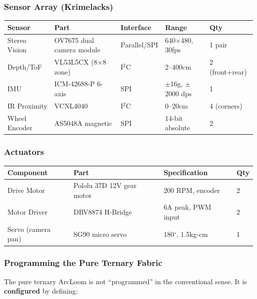 \documentclass[11pt, a4paper]{article}
\begin{document}
\subsubsection{Sensor Array (Krimelacks)}

\begin{center}
\begin{tabular}{@{}lllll@{}}
\toprule
\textbf{Sensor} & \textbf{Part} & \textbf{Interface} & \textbf{Range} & \textbf{Qty} \\
\midrule
Stereo Vision & OV7675 dual camera module & Parallel/SPI & 640$\times$480, 30fps & 1 pair \\
Depth/ToF & VL53L5CX (8$\times$8 zone) & I$^2$C & 2--400cm & 2 (front+rear) \\
IMU & ICM-42688-P 6-axis & SPI & $\pm$16g, $\pm$2000 dps & 1 \\
IR Proximity & VCNL4040 & I$^2$C & 0--20cm & 4 (corners) \\
Wheel Encoder & AS5048A magnetic & SPI & 14-bit absolute & 2 \\
\bottomrule
\end{tabular}
\end{center}

\subsubsection{Actuators}

\begin{center}
\begin{tabular}{@{}llll@{}}
\toprule
\textbf{Component} & \textbf{Part} & \textbf{Specification} & \textbf{Qty} \\
\midrule
Drive Motor & Pololu 37D 12V gear motor & 200 RPM, encoder & 2 \\
Motor Driver & DRV8874 H-Bridge & 6A peak, PWM input & 2 \\
Servo (camera pan) & SG90 micro servo & 180$^\circ$, 1.5kg-cm & 1 \\
\bottomrule
\end{tabular}
\end{center}

\subsubsection{Programming the Pure Ternary Fabric}

The pure ternary ArcLoom is not ``programmed'' in the conventional sense.
It is \textbf{configured} by defining:
\end{document}
